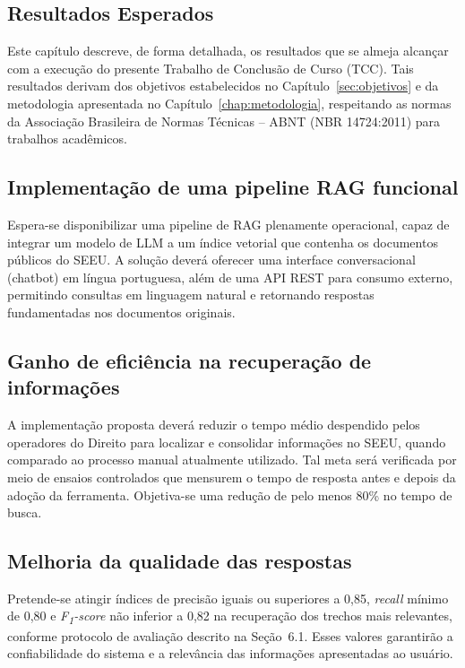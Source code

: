 \begin{description}
\chapter{Resultados Esperados}
\label{chap:resultados}

Este capítulo descreve, de forma detalhada, os resultados que se almeja alcançar com a execução do presente Trabalho de Conclusão de Curso (TCC). Tais resultados derivam dos objetivos estabelecidos no Capítulo~\ref{sec:objetivos} e da metodologia apresentada no Capítulo~\ref{chap:metodologia}, respeitando as normas da Associação Brasileira de Normas Técnicas -- ABNT (NBR 14724:2011) para trabalhos acadêmicos.

\section{Implementação de uma pipeline RAG funcional}
Espera-se disponibilizar uma pipeline de RAG plenamente operacional, capaz de integrar um modelo de LLM a um índice vetorial que contenha os documentos públicos do SEEU. A solução deverá oferecer uma interface conversacional (chatbot) em língua portuguesa, além de uma API REST para consumo externo, permitindo consultas em linguagem natural e retornando respostas fundamentadas nos documentos originais.

\section{Ganho de eficiência na recuperação de informações}
A implementação proposta deverá reduzir o tempo médio despendido pelos operadores do Direito para localizar e consolidar informações no SEEU, quando comparado ao processo manual atualmente utilizado. Tal meta será verificada por meio de ensaios controlados que mensurem o tempo de resposta antes e depois da adoção da ferramenta. Objetiva-se uma redução de pelo menos 80\% no tempo de busca.

\section{Melhoria da qualidade das respostas}
Pretende-se atingir índices de precisão iguais ou superiores a 0,85, \emph{recall} mínimo de 0,80 e \emph{F\textsubscript{1}-score} não inferior a 0,82 na recuperação dos trechos mais relevantes, conforme protocolo de avaliação descrito na Seção~6.1. Esses valores garantirão a confiabilidade do sistema e a relevância das informações apresentadas ao usuário.


\end{description}
